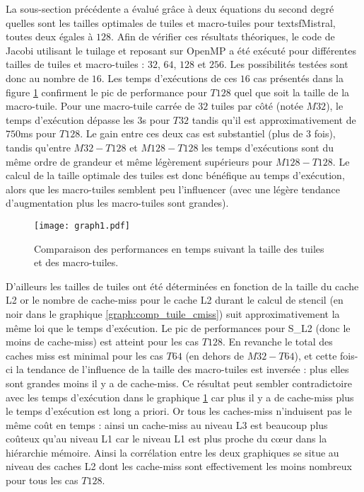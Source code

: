 La sous-section précédente a évalué grâce à deux équations du second degré quelles sont les tailles optimales de tuiles et macro-tuiles pour textsf{Mistral}, toutes deux égales à $128$. Afin de vérifier ces résultats théoriques, le code de Jacobi utilisant le tuilage et reposant sur \textsf{OpenMP} a été exécuté pour différentes tailles de tuiles et macro-tuiles : $32$, $64$, $128$ et $256$. Les possibilités testées sont donc au nombre de $16$. Les temps d'exécutions de ces $16$ cas présentés dans la figure \ref{graph:comp_tuile_time} confirment le pic de performance pour $T128$ quel que soit la taille de la macro-tuile. Pour une macro-tuile carrée de $32$ tuiles par côté (notée $M32$), le temps d'exécution dépasse les $3$s pour $T32$ tandis qu'il est approximativement de $750$ms pour $T128$. Le gain entre ces deux cas est substantiel (plus de $3$ fois), tandis qu'entre $M32-T128$ et $M128-T128$ les temps d'exécutions sont du même ordre de grandeur et même légèrement supérieurs pour $M128-T128$. Le calcul de la taille optimale des tuiles est donc bénéfique au temps d'exécution, alors que les macro-tuiles semblent peu l'influencer (avec une légère tendance d'augmentation plus les macro-tuiles sont grandes).

\begin{figure}[!h]
  \caption{Comparaison des performances en temps suivant la taille des tuiles et des macro-tuiles.}
  \label{graph:comp_tuile_time}
  \texttt{[image: graph1.pdf]}
\end{figure}

D'ailleurs les tailles de tuiles ont été déterminées en fonction de la taille du cache L2 or le nombre de cache-miss pour le cache L2 durant le calcul de stencil (en noir dans le graphique \ref{graph:comp_tuile_cmiss}) suit approximativement la même loi que le temps d'exécution. Le pic de performances pour S\_L2 (donc le moins de cache-miss) est atteint pour les cas $T128$. En revanche le total des caches miss est minimal pour les cas $T64$ (en dehors de $M32-T64$), et cette fois-ci la tendance de l'influence de la taille des macro-tuiles est inversée : plus elles sont grandes moins il y a de cache-miss. Ce résultat peut sembler contradictoire avec les temps d'exécution dans le graphique \ref{graph:comp_tuile_time} car plus il y a de cache-miss plus le temps d'exécution est long a priori. Or tous les caches-miss n'induisent pas le même coût en temps : ainsi un cache-miss au niveau L3 est beaucoup plus coûteux qu'au niveau L1 car le niveau L1 est plus proche du cœur dans la hiérarchie mémoire. Ainsi la corrélation entre les deux graphiques se situe au niveau des caches L2 dont les cache-miss sont effectivement les moins nombreux pour tous les cas $T128$. 

